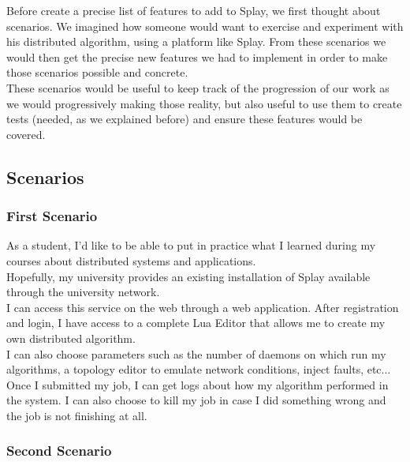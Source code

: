 \documentclass{eplmastersthesis}
\begin{document}
     Before create a precise list of features to add to Splay, we first
     thought about scenarios. We imagined how someone would want to exercise
     and experiment with his distributed algorithm, using a platform like
     Splay. From these scenarios we would then get the precise new features
     we had to implement in order to make those scenarios possible and
     concrete.\\

     These scenarios would be useful to keep track of the progression of our
     work as we would progressively making those reality, but also useful
     to use them to create tests (needed, as we explained before) and ensure
     these features would be covered.

      \subsection{Scenarios}

        \subsubsection{First Scenario}

          As a student, I'd like to be able to put in practice what I learned
          during my courses about distributed systems and applications.\\
          Hopefully, my university provides an existing installation of Splay
          available through the university network.\\
          I can access this service on the web through a web application. After
          registration and login, I have access to a complete Lua Editor that
          allows me to create my own distributed algorithm.\\
          I can also choose parameters such as the number of daemons on
          which run my algorithms, a topology editor to emulate network
          conditions, inject faults, etc...\\
          Once I submitted my job, I can get logs about how my algorithm
          performed in the system. I can also choose to kill my job in case
          I did something wrong and the job is not finishing at all.

        \subsubsection{Second Scenario}
\end{document}
